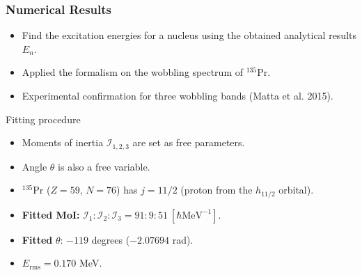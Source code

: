 \documentclass{beamer}
\begin{document}
\begin{frame}
  \frametitle{Numerical Results}
  \begin{itemize}
    \item Find the excitation energies for a nucleus using the obtained analytical results $E_n$.
    \item Applied the formalism on the wobbling spectrum of $^{135}$Pr.
    \item Experimental confirmation for three wobbling bands (Matta et al. 2015).
  \end{itemize}

  \begin{block}{Fitting procedure}
    \begin{itemize}
      \item Moments of inertia $\mathcal{I}_{1,2,3}$ are set as free parameters.
      \item Angle $\theta$ is also a free variable.
      \item $^{135}$Pr ($Z=59$, $N=76$) has $j=11/2$ (proton from the $h_{11/2}$ orbital).
      \item \textbf{Fitted MoI:} $\mathcal{I}_1:\mathcal{I}_2:\mathcal{I}_3=91:9:51\ [\hbar\text{MeV}^{-1}]$.
      \item \textbf{Fitted} $\theta$: $-119$ degrees ($-2.07694$ rad).
      \item $E_\text{rms}=0.170$ MeV.
    \end{itemize}
  \end{block}
\end{frame}
\end{document}
